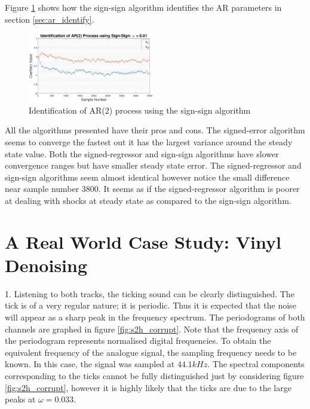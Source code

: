 \documentclass{article}
\begin{document}
Figure \ref{fig:signed_2} shows how the sign-sign algorithm identifies the AR parameters in section \ref{sec:ar_identify}.

\begin{figure}[H]
    \centering
    \includegraphics[width=0.49\textwidth]{sign_sign}
    \caption{Identification of AR(2) process using the sign-sign algorithm}
    \label{fig:signed_2}
\end{figure}

All the algorithms presented have their pros and cons. The signed-error algorithm seems to converge the fastest out it has the largest variance around the steady state value. Both the signed-regressor and sign-sign algorithms have slower convergence ranges but have smaller steady state error. The signed-regressor and sign-sign algorithms seem almost identical however notice the small difference near sample number 3800. It seems as if the signed-regressor algorithm is poorer at dealing with shocks at steady state as compared to the sign-sign algorithm. 

\newpage
\section{A Real World Case Study: Vinyl Denoising}\label{sec:vinyl_denoising}

1. Listening to both tracks, the ticking sound can be clearly distinguished. The tick is of a very regular nature; it is periodic. Thus it is expected that the noise will appear as a sharp peak in the frequency spectrum. The periodograms of both channels are graphed in figure \ref{fig:s2h_corrupt}. Note that the frequency axis of the periodogram represents normalised digital frequencies. To obtain the equivalent frequency of the analogue signal, the sampling frequency needs to be known. In this case, the signal was sampled at $44.1kHz$. The spectral components corresponding to the ticks cannot be fully distinguished just by considering figure \ref{fig:s2h_corrupt}, however it is highly likely that the ticks are due to the large peaks at $\omega=0.033$.
\end{document}
